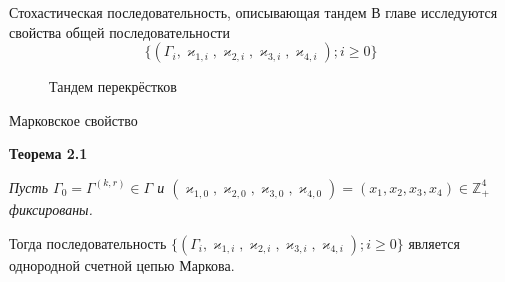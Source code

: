 \documentclass[10pt]{beamer}
\begin{document}
\begin{frame}{Стохастическая последовательность, описывающая тандем}
В главе исследуются свойства общей последовательности
\begin{equation}
    \{(\Gamma_i, \varkappa_{1,i},\varkappa_{2,i}, \varkappa_{3,i}, \varkappa_{4,i}); i \geqslant 0\}
\end{equation}
        \begin{figure}[h]
    \centering
    \caption{Тандем перекрёстков}
    \label{VK:fig:1}
  \end{figure}
\end{frame}


\begin{frame}{Марковское свойство}
\begin{block}
    {\bf Теорема 2.1} {\it 
Пусть $\Gamma_0=\Gamma^{(k,r)}\in \Gamma$ и $(\varkappa_{1,0},\varkappa_{2,0},\varkappa_{3,0},\varkappa_{4,0})=(x_1,x_2,x_3,x_4)\in \mathbb{Z}_+^4$ фиксированы. 

Тогда последовательность $\{(\Gamma_i, \varkappa_{1,i},\varkappa_{2,i}, \varkappa_{3,i}, \varkappa_{4,i}); i \geqslant 0\}$ является однородной счетной цепью Маркова.
}
\end{block}
\end{frame}
\end{document}
